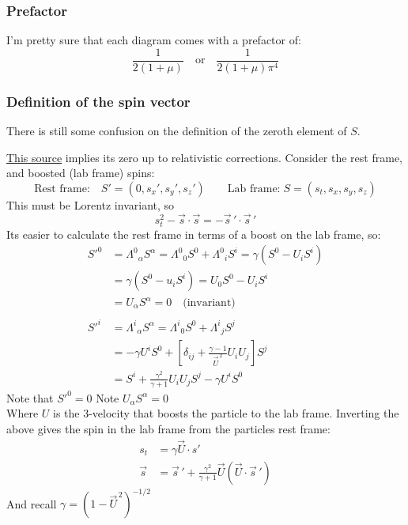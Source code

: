 \documentclass[11pt]{article}
\newcommand{\sq}{^{\,2}}
\begin{document}
\subsubsection{Prefactor}
I'm pretty sure that each diagram comes with a prefactor of:
\begin{equation}
    \frac{1}{2 \left( 1+\mu \right) }\quad\text{or}\quad \frac{1}{2 \left( 1+\mu \right) \pi^4}
\end{equation}
\subsubsection{Definition of the spin vector}
There is still some confusion on the definition of the zeroth element of $S$.

\href{https://en.wikipedia.org/wiki/Relativistic_angular_momentum#Spin_in_special_relativity}{This source}
implies its zero up to relativistic corrections. Consider the rest frame, and boosted (lab frame) spins:
\begin{equation}
    \text{Rest frame:}\quad S'= (0, s_x',s_y',s_z')
    \qquad\text{Lab frame:}\;
    S=(s_t, s_x,s_y,s_z)
\end{equation}
This must be Lorentz invariant, so 
\begin{equation}
    s_t^2 - \vec{s}\cdot \vec{s} = - \vec{s}\,' \cdot \vec{s}\,'
\end{equation}
Its easier to calculate the rest frame in terms of a boost on the lab frame, so:
\begin{align}
{S'}^{0}&={\Lambda ^{0}}_{\alpha }S^{\alpha }={\Lambda ^{0}}_{0}S^{0}+{\Lambda ^{0}}_{i}S^{i}=\gamma \left(S^{0}-U_{i}S^{i}\right)\\
        &=\gamma \left(S^{0}-u_i S^{i}\right)=U_{0}S^{0}-U_{i}S^{i}\\
        &=U_\alpha S^\alpha=0\quad\text{(invariant)}\\
        &\nonumber\\
{S'}^{i}&={\Lambda ^{i}}_{\alpha }S^{\alpha }={\Lambda ^{i}}_{0}S^{0}+{\Lambda ^{i}}_{j}S^{j}\\
        &=-\gamma U^{i}S^{0}+\left[\delta _{ij}+{\frac {\gamma -1}{\vec{U}^{\,2}}}U_{i}U_{j}\right]S^{j}\\
        & =S^{i}+{\frac {\gamma ^{2}}{\gamma +1}}U_{i}U_{j}S^{j}-\gamma U^{i}S^{0}
\end{align}
Note that $S'^0=0$ 
Note $U_\alpha S^\alpha=0$\\
Where $U$ is the 3-velocity that boosts the particle to the lab frame. Inverting the above gives the spin in the lab
frame from the particles rest frame:
\begin{align}
    s_t&= \gamma \vec{U} \cdot s'\\
    \vec{s}&= \vec{s}{\,'}+ \frac{\gamma^2}{\gamma+1}  \vec{U} \left( \vec{U} \cdot \vec{s}{\,'} \right)
\end{align}
And recall $\gamma= \left( 1-\vec{U}\sq \right)^{-1/2}$
\end{document}
